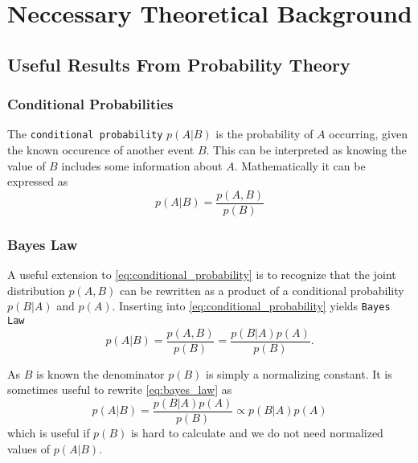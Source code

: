 \chapter{Neccessary Theoretical Background}

\section{Useful Results From Probability Theory}
 
\subsection{Conditional Probabilities}
The \texttt{conditional probability} $p(A | B)$ is the probability of $A$ occurring, given the known occurence of another event $B$. This can be interpreted as knowing the value of $B$ includes some information about $A$. Mathematically it can be expressed as
\begin{equation}\label{eq:conditional_probability}
    p(A | B) = \frac{p(A, B)}{p(B)}
\end{equation}

\subsection{Bayes Law}

A useful extension to \cref{eq:conditional_probability} is to recognize that the joint distribution $p(A, B)$ can be rewritten as a product of a conditional probability $p(B | A)$ and $p(A)$. Inserting into \cref{eq:conditional_probability} yields \texttt{Bayes Law}
\begin{equation}\label{eq:bayes_law}
    p(A | B) = \frac{p(A, B)}{p(B)} = \frac{p(B | A)p(A)}{p(B)}.
\end{equation}

As $B$ is known the denominator $p(B)$ is simply a normalizing constant. It is sometimes useful to rewrite \cref{eq:bayes_law} as
\begin{equation}\label{eq:bayes_law_proportional}
    p(A | B) = \frac{p(B | A) p(A)}{p(B)} \propto p(B | A)p(A)
\end{equation} 
which is useful if $p(B)$ is hard to calculate and we do not need normalized values of $p(A | B)$.

